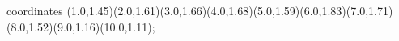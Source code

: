 					coordinates { (1.0,1.45)(2.0,1.61)(3.0,1.66)(4.0,1.68)(5.0,1.59)(6.0,1.83)(7.0,1.71)(8.0,1.52)(9.0,1.16)(10.0,1.11)};